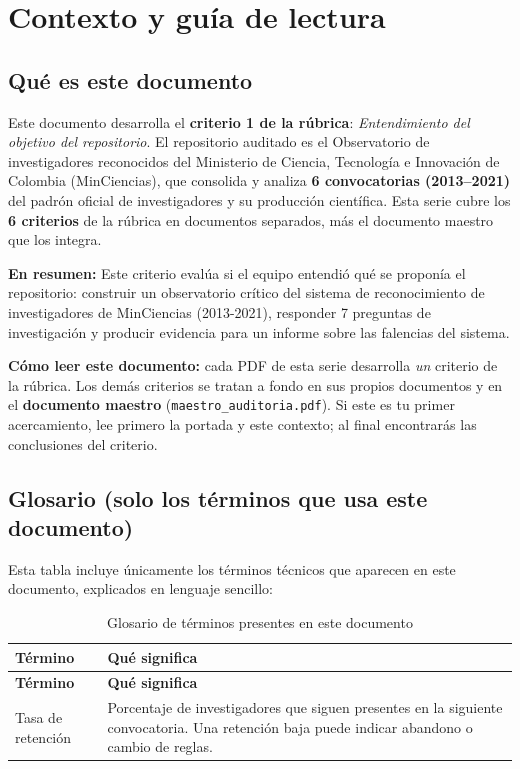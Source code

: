 \section{Contexto y guía de lectura}

\subsection{Qué es este documento}

Este documento desarrolla el \textbf{criterio 1 de la rúbrica}:
\emph{Entendimiento del objetivo del repositorio}. El repositorio auditado es el
Observatorio de investigadores reconocidos del Ministerio de Ciencia,
Tecnología e Innovación de Colombia (MinCiencias), que consolida y analiza
\textbf{6 convocatorias (2013--2021)} del padrón oficial de investigadores
y su producción científica. Esta serie cubre los \textbf{6 criterios} de la
rúbrica en documentos separados, más el documento maestro que los integra.

\textbf{En resumen:} Este criterio evalúa si el equipo entendió qué se proponía el repositorio: construir un observatorio crítico del sistema de reconocimiento de investigadores de MinCiencias (2013-2021), responder 7 preguntas de investigación y producir evidencia para un informe sobre las falencias del sistema.




\begin{tcolorbox}[nota]
\textbf{Cómo leer este documento:} cada PDF de esta serie desarrolla \emph{un}
criterio de la rúbrica. Los demás criterios se tratan a fondo en sus propios
documentos y en el \textbf{documento maestro} (\texttt{maestro\_auditoria.pdf}).
Si este es tu primer acercamiento, lee primero la portada y este contexto; al
final encontrarás las conclusiones del criterio.
\end{tcolorbox}

\subsection{Glosario (solo los términos que usa este documento)}

Esta tabla incluye únicamente los términos técnicos que aparecen en este
documento, explicados en lenguaje sencillo:

\begingroup
\small
\setlength{\tabcolsep}{3pt}
\begin{longtable}{>{\raggedright\arraybackslash}p{4.3cm}>{\raggedright\arraybackslash}p{9.8cm}}
\caption{Glosario de términos presentes en este documento}
\label{tab:glosario}\\
\toprule
\textbf{Término} & \textbf{Qué significa} \\
\midrule
\endfirsthead
\toprule
\textbf{Término} & \textbf{Qué significa} \\
\midrule
\endhead
    Tasa de retención & Porcentaje de investigadores que siguen presentes en la siguiente convocatoria. Una retención baja puede indicar abandono o cambio de reglas.
 \\
\bottomrule
\end{longtable}
\endgroup
